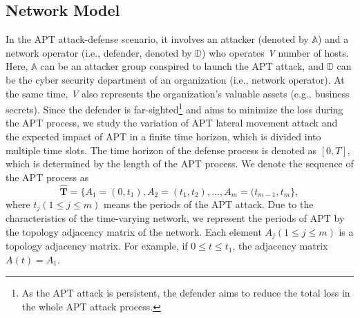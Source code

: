 \documentclass[lettersize,journal]{IEEEtran}
\begin{document}
\subsection{Network Model}\label{dyn APT model}
In the APT attack-defense scenario, it involves an attacker (denoted by $\mathbb{A}$) and a network operator (i.e., defender, denoted by $\mathbb{D}$) who operates \emph{V} number of hosts. Here, $\mathbb{A}$ can be an attacker group conspired to launch the APT attack, and $\mathbb{D}$ can be the cyber security department of an organization (i.e., network operator). At the same time, \emph{V} also represents the organization's valuable assets (e.g., business secrets). Since the defender is far-sighted\footnote{As the APT attack is persistent, the defender aims to reduce the total loss in the whole APT attack process.} and aims to minimize the loss during the APT process, we study the variation of APT lateral movement attack and the expected impact of APT in a finite time horizon, which is divided into multiple time slots. The time horizon of the defense process is denoted as $[0, T]$, which is determined by the length of the APT process. We denote the sequence of the APT process as 
\begin{equation}
\label{eq_T}
\bm{\hat{T}}=\{A_1=(0,t_1),A_2=(t_1,t_2),...,A_m=(t_{m-1},t_{m}\},
\end{equation}
where $t_j (1 \leq j \leq m)$ means the periods of the APT attack. Due to the characteristics of the time-varying network, we represent the periods of APT by the topology adjacency matrix of the network. Each element $A_j (1 \leq j \leq m)$ is a topology adjacency matrix. For example, if $0\leq t \leq t_1$, the adjacency matrix $A(t)=A_1$. 
\end{document}
